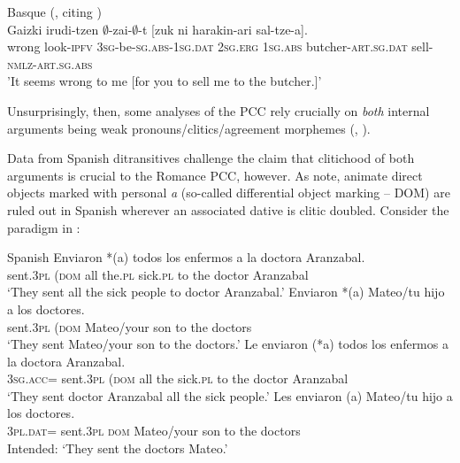 \documentclass[output=paper,colorlinks,citecolor=brown,nonflat]{langsci/langscibook}
\begin{document}
\ea%
    \label{ex:sheehan:10}
    Basque (\citealt[7]{Preminger2019}, citing \citealt[98]{Laka1996})\\
    \gll    Gaizki   irudi-tzen ${\emptyset}$-zai-${\emptyset}$-t         [zuk ni harakin-ari    sal-tze-a].\\
          wrong   look-\textsc{ipfv} \textsc{3sg}-be-\textsc{sg}.\textsc{abs}{}-\textsc{1sg}.\textsc{dat}  {\db}\textsc{2sg}.\textsc{erg}    \textsc{1sg}.\textsc{abs} butcher-\textsc{art.sg}.\textsc{dat} sell-\textsc{nmlz-art.sg.abs}\\
    \glt 'It seems wrong to me [for you to sell me to the butcher.]' %
\z

Unsurprisingly, then, some analyses of the PCC rely crucially on \textit{both} internal arguments being weak pronouns/clitics/agreement morphemes (\citealt{Bianchi2006}, \citealt{Stegovec2017}).

Data from Spanish ditransitives challenge the claim that clitichood of both arguments is crucial to the Romance PCC, however. As \citet{OrmazabalRomero2013Borealis} note, animate direct objects marked with personal \textit{a} (so-called differential object marking – DOM) are ruled out in Spanish wherever an associated dative is clitic doubled. Consider the paradigm in :

\ea%
    \label{ex:sheehan:11}
    Spanish \citep[224]{OrmazabalRomero2013Borealis}
    \ea\label{ex:sheehan:11a}
    \gll   Enviaron   *(a)   todos los   enfermos a   la   doctora   Aranzabal.\\
        sent.\textsc{3pl}  (\textsc{dom}   all   the.\textsc{pl}   sick.\textsc{pl}  to   the   doctor   Aranzabal\\
    \glt ‘They sent all the sick people to doctor Aranzabal.’
    \ex\label{ex:sheehan:11b}
    \gll   Enviaron  *(a)   Mateo/tu   hijo   a   los   doctores.\\
         sent.\textsc{3pl}  (\textsc{dom}   Mateo/your   son   to   the   doctors\\
    \glt ‘They sent Mateo/your son to the doctors.’
    \ex\label{ex:sheehan:11c}
    \gll   Le   enviaron   (*a)  todos   los  enfermos   a  la  doctora   Aranzabal.\\
        \textsc{3sg.acc=} sent.\textsc{3pl}   (\textsc{dom}   all   the sick.\textsc{pl}   to   the doctor Aranzabal\\
    \glt ‘They sent doctor Aranzabal all the sick people.’
    \ex\label{ex:sheehan:11d}
    \gll    *Les   enviaron   (a)   Mateo/tu   hijo  a   los   doctores.\\
        \textsc{3pl.dat}=  sent.\textsc{3pl}   \textsc{dom}   Mateo/your   son   to   the   doctors\\
    \glt Intended: ‘They sent the doctors Mateo.’
    \z
\z
\end{document}

